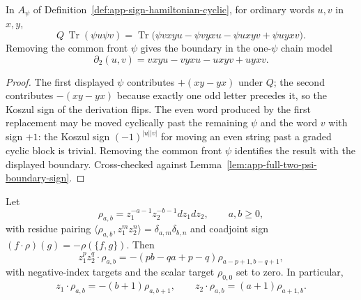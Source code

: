\begin{lem}
\label{lem:app-sign-one-psi-boundary}
  In \(A_\psi\) of
  Definition~\ref{def:app-sign-hamiltonian-cyclic}, for ordinary words
  \(u,v\) in \(x,y\),
  \[
    Q\,\operatorname{Tr}(\psi u\psi v)
      =
      \operatorname{Tr}\bigl(\psi vxyu-\psi vyxu-\psi uxyv+\psi uyxv\bigr).
  \]
  Removing the common front \(\psi\) gives the boundary in the
  one-\(\psi\) chain model
  \[
    \partial_2(u,v)=vxyu-vyxu-uxyv+uyxv.
  \]
\end{lem}

\begin{proof}
  The first displayed \(\psi\) contributes \(+(xy-yx)\) under \(Q\);
  the second contributes \(-(xy-yx)\) because exactly one odd letter
  precedes it, so the Koszul sign of the derivation flips.  The even
  word produced by the first replacement may be moved cyclically past
  the remaining \(\psi\) and the word \(v\) with sign \(+1\):
  the Koszul sign \((-1)^{|u||v|}\) for moving an even string past a
  graded cyclic block is trivial.  Removing the common front \(\psi\)
  identifies the result with the displayed boundary.  Cross-checked
  against Lemma~\ref{lem:app-full-two-psi-boundary-sign}.
\end{proof}

\begin{lem}
\label{lem:app-sign-principal-part}
  Let
  \[
    \rho_{a,b}=z_1^{-a-1}z_2^{-b-1}dz_1dz_2,\qquad a,b\geq0,
  \]
  with residue pairing
  \(\langle\rho_{a,b},z_1^mz_2^n\rangle=\delta_{a,m}\delta_{b,n}\) and
  coadjoint sign \((f\cdot\rho)(g)=-\rho(\{f,g\})\).  Then
  \[
    z_1^pz_2^q\cdot\rho_{a,b}
      =-(pb-qa+p-q)\rho_{a-p+1,b-q+1},
  \]
  with negative-index targets and the scalar target \(\rho_{0,0}\)
  set to zero.  In particular,
  \[
    z_1\cdot\rho_{a,b}=-(b+1)\rho_{a,b+1},\qquad
    z_2\cdot\rho_{a,b}=(a+1)\rho_{a+1,b}.
  \]
\end{lem}

